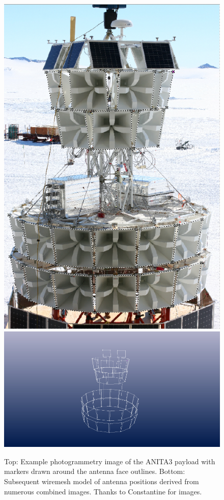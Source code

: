 	\begin{figure}
	\label{fig:photogram1}
		\centering
		\includegraphics[height=0.5\textheight]{figures/KBelovANITA-III_photogrammetry_update-3}
		\includegraphics[width=\textwidth]{figures/KBelovANITA-III_photogrammetry_update-4}
		\caption{Top: Example photogrammetry image of the ANITA3 payload with markers drawn around the antenna face outlines.  Bottom: Subsequent wiremesh model of antenna positions derived from numerous combined images.  Thanks to Constantine for images.}
	\end{figure}
	
